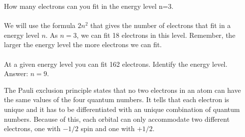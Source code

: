 \documentclass[main.tex]{subfiles}
\begin{document}
\begin{description}
\begin{example} %
How many electrons can you fit in the energy level n=3.\\
\textlcsc{ \textcolor{dgreen}{\Large Solution} }\\
We will use the formula $2n^2 $ that gives the number of electrons that fit in a energy level $n$. As $n=3$, we can fit 18 electrons in this level. Remember, the larger the energy level the more electrons we can fit. \\
\faDiamond\ \\At a given energy level you can fit 162 electrons. Identify the energy level.
\flushright Answer: $n=9$. 
\end{example}%


\item[\docfilehook{The Pauli exclusion principle}{}] 
The Pauli exclusion principle states that no two electrons in an atom can have the same values of the four quantum numbers. It tells that each electron is unique and it has to be differentiated with an unique combination of quantum numbers. Because of this, each orbital can only accommodate two different electrons, one with $-1/2$ spin and one with $+1/2$. 


\end{description}
\end{document}
